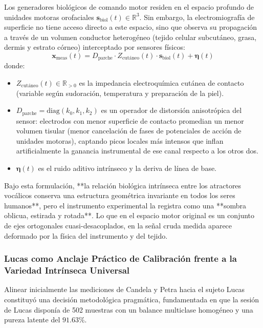 \documentclass[11pt,a4paper]{article}
\begin{document}
Los generadores biológicos de comando motor residen en el espacio profundo de unidades motoras orofaciales $\mathbf{s}_{\text{biol}}(t) \in \mathbb{R}^3$. Sin embargo, la electromiografía de superficie no tiene acceso directo a este espacio, sino que observa su propagación a través de un volumen conductor heterogéneo (tejido celular subcutáneo, grasa, dermis y estrato córneo) interceptado por sensores físicos:
\begin{equation}
\mathbf{x}_{\text{meas}}(t) = D_{\text{parche}} \cdot Z_{\text{cutáneo}}(t) \cdot \mathbf{s}_{\text{biol}}(t) + \boldsymbol{\eta}(t)
\end{equation}
donde:
\begin{itemize}
    \item $Z_{\text{cutáneo}}(t) \in \mathbb{R}_{>0}$ es la impedancia electroquímica cutánea de contacto (variable según sudoración, temperatura y preparación de la piel).
    \item $D_{\text{parche}} = \text{diag}(k_0, k_1, k_2)$ es un operador de distorsión anisotrópica del sensor: electrodos con menor superficie de contacto promedian un menor volumen tisular (menor cancelación de fases de potenciales de acción de unidades motoras), captando picos locales más intensos que inflan artificialmente la ganancia instrumental de ese canal respecto a los otros dos.
    \item $\boldsymbol{\eta}(t)$ es el ruido aditivo intrínseco y la deriva de línea de base.
\end{itemize}

Bajo esta formulación, **la relación biológica intrínseca entre los atractores vocálicos conserva una estructura geométrica invariante en todos los seres humanos**, pero el instrumento experimental la registra como una **sombra oblicua, estirada y rotada**. Lo que en el espacio motor original es un conjunto de ejes ortogonales cuasi-desacoplados, en la señal cruda medida aparece deformado por la física del instrumento y del tejido.

\subsubsection{Lucas como Anclaje Práctico de Calibración frente a la Variedad Intrínseca Universal}
\label{subsubsec:lucas_anclaje_practico}

Alinear inicialmente las mediciones de Candela y Petra hacia el sujeto Lucas constituyó una decisión metodológica pragmática, fundamentada en que la sesión de Lucas disponía de 502 muestras con un balance multiclase homogéneo y una pureza latente del $91.63\%$. 
\end{document}
